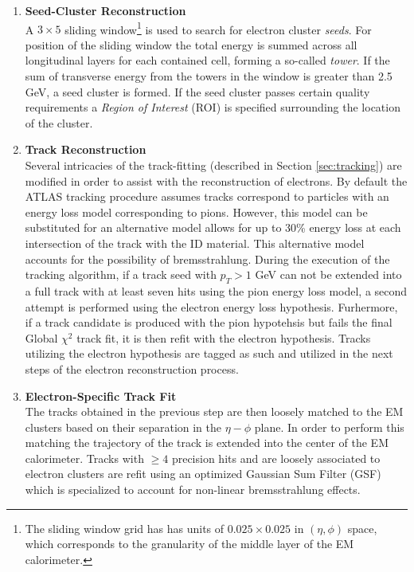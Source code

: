 \begin{enumerate}
    \item \textbf{Seed-Cluster Reconstruction}\\
        A $3 \times 5$ sliding window\footnote{The sliding window grid has has units of $0.025 \times 0.025$ in $(\eta, \phi)$ space, which corresponds to the granularity of the middle layer of the EM calorimeter.} is used to search for electron cluster \textit{seeds}.
        For position of the sliding window the total energy is summed across all longitudinal layers for each contained cell, forming a so-called \textit{tower}.
        If the sum of transverse energy from the towers in the window is greater than 2.5 GeV, a seed cluster is formed.
        If the seed cluster passes certain quality requirements a \textit{Region of Interest} (ROI) is specified surrounding the location of the cluster.
    \item \textbf{Track Reconstruction}\\
        Several intricacies of the track-fitting (described in Section \ref{sec:tracking}) are modified in order to assist with the reconstruction of electrons.
        By default the ATLAS tracking procedure assumes tracks correspond to particles with an energy loss model corresponding to pions.
        However, this model can be substituted for an alternative model allows for up to 30\% energy loss at each intersection of the track with the ID material.
        This alternative model accounts for the possibility of bremsstrahlung.
        During the execution of the tracking algorithm, if a track seed with $p_T > 1$ GeV can not be extended into a full track with at least seven hits using the pion energy loss model, a second attempt is performed using the electron energy loss hypothesis.
        Furhermore, if a track candidate is produced with the pion hypotehsis but fails the final Global $\chi^2$ track fit, it is then refit with the electron hypothesis.
        Tracks utilizing the electron hypothesis are tagged as such and utilized in the next steps of the electron reconstruction process.
    \item \textbf{Electron-Specific Track Fit}\\
        The tracks obtained in the previous step are then loosely matched to the EM clusters based on their separation in the $\eta-\phi$ plane.
        In order to perform this matching the trajectory of the track is extended into the center of the EM calorimeter.
        Tracks with $\geq 4$ precision hits and are loosely associated to electron clusters are refit using an optimized Gaussian Sum Filter (GSF) \cite{ATLAS-CONF-2012-047} which is specialized to account for non-linear bremsstrahlung effects.

\end{enumerate}
